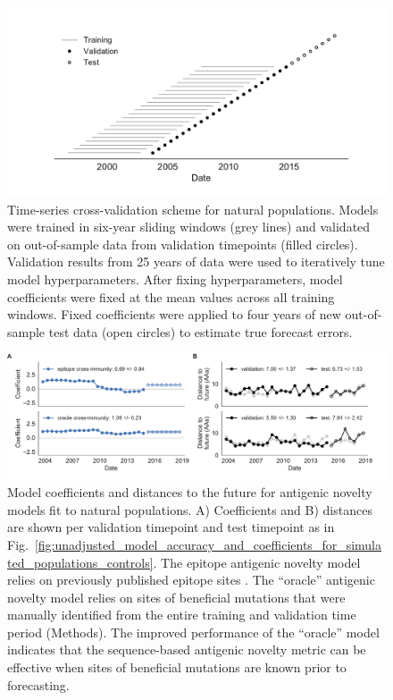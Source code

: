 \begin{figure}[H]
  \begin{center}
  \includegraphics[width=\textwidth]{figures/cross-validation-for-natural-populations.pdf}
  \caption{
  Time-series cross-validation scheme for natural populations.
  Models were trained in six-year sliding windows (grey lines) and validated on out-of-sample data from validation timepoints (filled circles).
  Validation results from 25 years of data were used to iteratively tune model hyperparameters.
  After fixing hyperparameters, model coefficients were fixed at the mean values across all training windows.
  Fixed coefficients were applied to four years of new out-of-sample test data (open circles) to estimate true forecast errors.
  }
  \label{sup_fig:cross_validation_for_natural_populations}
  \end{center}
\end{figure}

\begin{figure}[H]
  \begin{center}
  \includegraphics[width=\textwidth]{figures/unadjusted-composite-model-accuracy-and-coefficients-for-natural-populations-epitope-vs-oracle.pdf}
  \caption{
  Model coefficients and distances to the future for antigenic novelty models fit to natural populations.
  A) Coefficients and B) distances are shown per validation timepoint and test timepoint as in Fig.~\ref{fig:unadjusted_model_accuracy_and_coefficients_for_simulated_populations_controls}.
  The epitope antigenic novelty model relies on previously published epitope sites \cite{Luksza:2014hj}.
  The ``oracle'' antigenic novelty model relies on sites of beneficial mutations that were manually identified from the entire training and validation time period (Methods).
  The improved performance of the ``oracle'' model indicates that the sequence-based antigenic novelty metric can be effective when sites of beneficial mutations are known prior to forecasting.
  }
  \label{sup_fig:unadjusted_composite_model_accuracy_and_coefficients_for_natural_populations_epitope_vs_oracle}
  \end{center}
\end{figure}


